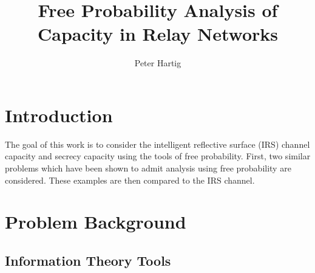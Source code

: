 \documentclass[12pt,a4paper]{report}
\title{Free Probability Analysis of Capacity in Relay Networks}
\author{Peter Hartig}
\begin{document}
\maketitle
\tableofcontents
\chapter{Introduction}
The goal of this work is to consider the intelligent reflective surface (IRS) channel capacity and secrecy capacity using the tools of free probability. First, two similar problems which have been shown to admit analysis using free probability are considered. These examples are then compared to the IRS channel. 
\par

\chapter{Problem Background}

\section{Information Theory Tools}
\end{document}
